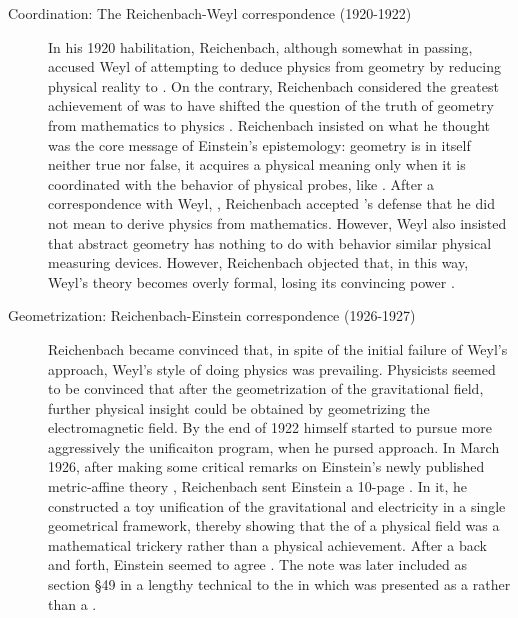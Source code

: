\documentclass[final]{article}
\newcommand{\PRZL}{\citetitle{Reichenbach1928}\xspace}
\begin{document}
\begin{description}
\item[Coordination: The Reichenbach-Weyl correspondence (1920-1922)]\label{reichenbachweyl} In his 1920 habilitation, Reichenbach, although somewhat in passing, accused Weyl of attempting to deduce physics from geometry by reducing physical reality to  \citep[73]{Reichenbach1920a}. On the contrary, Reichenbach considered the greatest achievement of \gr was to have shifted the question of the truth of geometry from mathematics to physics \citep[73]{Reichenbach1920a}. Reichenbach insisted on what he thought was the core message of Einstein's epistemology: \spti geometry is in itself neither true nor false, it acquires a physical meaning only when it is coordinated with the behavior of physical probes, like \rac. After a correspondence with Weyl, \citet[367--368]{Reichenbach1921}, Reichenbach accepted 's defense that he did not mean to derive physics from mathematics. However, Weyl also insisted that abstract \spti geometry has nothing to do with behavior similar physical measuring devices. However, Reichenbach objected that, in this way, Weyl's theory becomes overly formal, losing its convincing power \citep[367]{Reichenbach1921}.

\item[Geometrization: Reichenbach-Einstein correspondence (1926-1927)]\label{reichenbacheinsteinI} Reichenbach became convinced that, in spite of the initial failure of Weyl's approach, Weyl's style of doing physics was prevailing. Physicists seemed to be convinced that after the geometrization of the gravitational field, further physical insight could be obtained by geometrizing the electromagnetic field. By the end of 1922  himself started to pursue more aggressively the unificaiton program, when he pursed  approach. In March 1926, after making some critical remarks on Einstein's newly published metric-affine theory \citep{Einstein1925a}, Reichenbach sent Einstein a 10-page  \citep{Reichenbach1926f}. In it, he constructed a toy unification of the gravitational and electricity in a single geometrical framework, thereby showing that the  of a physical field was a mathematical trickery rather than a physical achievement. After a back and forth, Einstein seemed to agree \citep{Lehmkuhl2014}. The note was later included as section \S49 in a lengthy technical \Ap to the \PRZL \citep[-50]{Reichenbach1928} in which \gr was presented as a  rather than a  \citep{Giovanelli2020}. 


\end{description}
\end{document}
